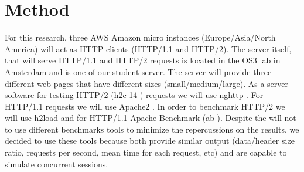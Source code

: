 \section{Method}
\label{method}
For this research, three AWS Amazon  micro instances (Europe/Asia/North America) will act as HTTP clients (HTTP/1.1 and HTTP/2). The server itself, that will serve HTTP/1.1 and HTTP/2 requests is located in the OS3 lab in Amsterdam and is one of our student server. The server will provide three different web  pages that have different sizes (small/medium/large). As a server software for testing HTTP/2 (h2c-14 \cite{h2c-14}) requests we will use nghttp \cite{nghttp}. For HTTP/1.1 requests we will use Apache2 \cite{apache2}. In order to benchmark HTTP/2 we will use h2load \cite{h2load} and for HTTP/1.1 Apache Benchmark (ab \cite{ab}). Despite the will not to use different benchmarks tools to minimize the repercussions on the results, we decided to use these tools because both provide similar output (data/header size ratio, requests per second, mean time for each request, etc) and are capable to simulate concurrent sessions. 

